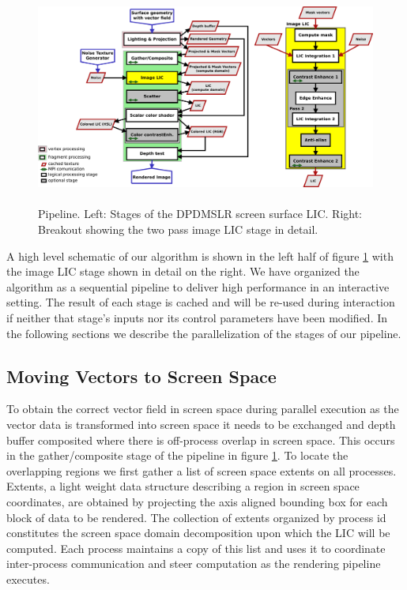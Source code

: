 \documentclass[a4paper,10pt]{article}
\begin{document}
\begin{figure}
 \centering
 \includegraphics[height=2.8in]{flow-color.png}
 \caption{\small Pipeline. Left: Stages of the DPDMSLR screen surface LIC. Right: Breakout showing the two pass image LIC stage in detail.}
 \label{fig:pipeline}
\end{figure}
A high level schematic of our algorithm is shown in the left half of figure \ref{fig:pipeline} with the image LIC stage shown in detail on the right. We have organized the algorithm as a sequential pipeline to deliver high performance in an interactive setting. The result of each stage is cached and will be re-used during interaction if neither that stage's inputs nor its control parameters have been modified. In the following sections we describe the parallelization of the stages of our pipeline.

\subsection{Moving Vectors to Screen Space}
To obtain the correct vector field in screen space during parallel execution as the vector data is transformed into screen space it needs to be exchanged and depth buffer composited where there is off-process overlap in screen space. This occurs in the gather/composite stage of the pipeline in figure \ref{fig:pipeline}. To locate the overlapping regions we first gather a list of screen space extents on all processes. Extents, a light weight data structure describing a region in screen space coordinates, are obtained by projecting the axis aligned bounding box for each block of data to be rendered. The collection of extents organized by process id constitutes the screen space domain decomposition upon which the LIC will be computed. Each process maintains a copy of this list and uses it to coordinate inter-process communication and steer computation as the rendering pipeline executes.
\end{document}
